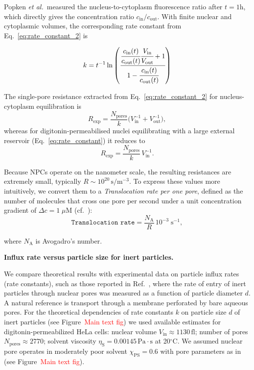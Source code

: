 \documentclass[10pt, a4paper]{article}
\newcommand\todo[1]{\textcolor{red}{#1}}
\begin{document}
\begin{multicols}{2}
Popken \textit{et al.}\,\cite{Popken2015} measured the
nucleus-to-cytoplasm fluorescence ratio after $t =  1\text{h}$, which directly gives the concentration ratio
$c_{\text{in}}/c_{\text{out}}$.  
With finite nuclear and cytoplasmic volumes, the corresponding rate
constant from Eq.~\ref{eq:rate_constant_2} is

\begin{equation}
    k = t^{-1}\ln\left(
        \cfrac{\cfrac{c_{\text{in}}(t)}{c_{\text{out}}(t)} \cfrac{V_{\text{in}}}{V_{\text{out}}} +1}
             {1 - \cfrac{c_{\text{in}}(t)}{c_{\text{out}}(t)}}
        \right)
\end{equation}

The single-pore resistance extracted from Eq.~\ref{eq:rate_constant_2}
for nucleus-cytoplasm equilibration is
\begin{equation*}
  R_{\text{exp}}
  = \frac{N_{\text{pores}}}{k}
    \bigl(V_{\text{in}}^{-1}+V_{\text{out}}^{-1}\bigr),
\end{equation*}
whereas for digitonin-permeabilised nuclei equilibrating with a large
external reservoir (Eq.~\ref{eq:rate_constant}) it reduces to
\begin{equation*}
  R_{\text{exp}}
  = \frac{N_{\text{pores}}}{k}\,V_{\text{in}}^{-1}.
\end{equation*}

Because NPCs operate on the nanometer scale, the resulting resistances are extremely small, typically
$R\sim10^{20}\,\text{s}/\text{m}^{-3}$.  
To express these values more intuitively, we convert them to a
\textit{Translocation rate per one pore}, defined as the number of molecules that cross one pore per second under a unit concentration gradient of $\Delta c = 1\;\mu\text{M}$ (cf.~\cite{Ribbeck2001}):
\begin{equation}
    \texttt{Translocation rate}
    = \frac{N_{\mathrm{A}}}{R}\,10^{-3}\;\text{s}^{-1},
\end{equation}

where \(N_{\mathrm{A}}\) is Avogadro's number.

\textbf{Influx rate versus particle size for inert particles.}

We compare theoretical results with experimental data on particle influx rates (rate constants), such as those reported in Ref.~\cite{Ribbeck2001}, where the rate of entry of inert particles through nuclear pores was measured as a function of particle diameter $d$.
A natural reference is transport through a membrane perforated by bare aqueous pores.
For the theoretical dependencies of rate constants $k$ on particle size $d$ of inert particles (see Figure~{\todo{Main text fig}}) we used available estimates \cite{Ribbeck2001} for digitonin-permeabilized HeLa cells:
nuclear volume $V_{\text{in}} \approx 1130 \, \text{fl}$;
number of pores $N_{\text{pores}} \approx 2770$;
solvent viscosity $\eta_{\text{S}} = 0.00145 \, \text{Pa} \cdot \text{s}$ at 20$^\circ$C.
We assumed nuclear pore operates in moderately poor solvent $\chi_{\text{PS}} = 0.6$ with pore parameters as in (see Figure~{\todo{Main text fig}}).


\end{multicols}
\end{document}

